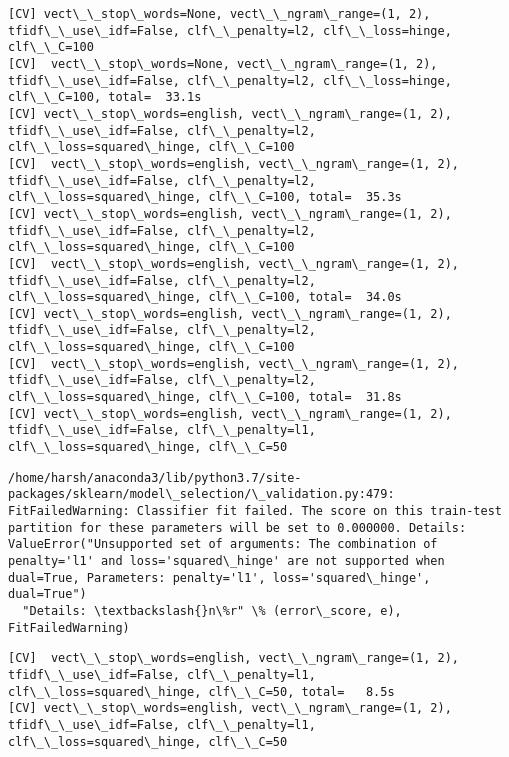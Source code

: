 \documentclass[11pt]{article}
\begin{document}
\begin{Verbatim}[commandchars=\\\{\}]
[CV] vect\_\_stop\_words=None, vect\_\_ngram\_range=(1, 2), tfidf\_\_use\_idf=False, clf\_\_penalty=l2, clf\_\_loss=hinge, clf\_\_C=100 
[CV]  vect\_\_stop\_words=None, vect\_\_ngram\_range=(1, 2), tfidf\_\_use\_idf=False, clf\_\_penalty=l2, clf\_\_loss=hinge, clf\_\_C=100, total=  33.1s
[CV] vect\_\_stop\_words=english, vect\_\_ngram\_range=(1, 2), tfidf\_\_use\_idf=False, clf\_\_penalty=l2, clf\_\_loss=squared\_hinge, clf\_\_C=100 
[CV]  vect\_\_stop\_words=english, vect\_\_ngram\_range=(1, 2), tfidf\_\_use\_idf=False, clf\_\_penalty=l2, clf\_\_loss=squared\_hinge, clf\_\_C=100, total=  35.3s
[CV] vect\_\_stop\_words=english, vect\_\_ngram\_range=(1, 2), tfidf\_\_use\_idf=False, clf\_\_penalty=l2, clf\_\_loss=squared\_hinge, clf\_\_C=100 
[CV]  vect\_\_stop\_words=english, vect\_\_ngram\_range=(1, 2), tfidf\_\_use\_idf=False, clf\_\_penalty=l2, clf\_\_loss=squared\_hinge, clf\_\_C=100, total=  34.0s
[CV] vect\_\_stop\_words=english, vect\_\_ngram\_range=(1, 2), tfidf\_\_use\_idf=False, clf\_\_penalty=l2, clf\_\_loss=squared\_hinge, clf\_\_C=100 
[CV]  vect\_\_stop\_words=english, vect\_\_ngram\_range=(1, 2), tfidf\_\_use\_idf=False, clf\_\_penalty=l2, clf\_\_loss=squared\_hinge, clf\_\_C=100, total=  31.8s
[CV] vect\_\_stop\_words=english, vect\_\_ngram\_range=(1, 2), tfidf\_\_use\_idf=False, clf\_\_penalty=l1, clf\_\_loss=squared\_hinge, clf\_\_C=50 

    \end{Verbatim}

    \begin{Verbatim}[commandchars=\\\{\}]
/home/harsh/anaconda3/lib/python3.7/site-packages/sklearn/model\_selection/\_validation.py:479: FitFailedWarning: Classifier fit failed. The score on this train-test partition for these parameters will be set to 0.000000. Details: 
ValueError("Unsupported set of arguments: The combination of penalty='l1' and loss='squared\_hinge' are not supported when dual=True, Parameters: penalty='l1', loss='squared\_hinge', dual=True")
  "Details: \textbackslash{}n\%r" \% (error\_score, e), FitFailedWarning)

    \end{Verbatim}

    \begin{Verbatim}[commandchars=\\\{\}]
[CV]  vect\_\_stop\_words=english, vect\_\_ngram\_range=(1, 2), tfidf\_\_use\_idf=False, clf\_\_penalty=l1, clf\_\_loss=squared\_hinge, clf\_\_C=50, total=   8.5s
[CV] vect\_\_stop\_words=english, vect\_\_ngram\_range=(1, 2), tfidf\_\_use\_idf=False, clf\_\_penalty=l1, clf\_\_loss=squared\_hinge, clf\_\_C=50 

    \end{Verbatim}
\end{document}
